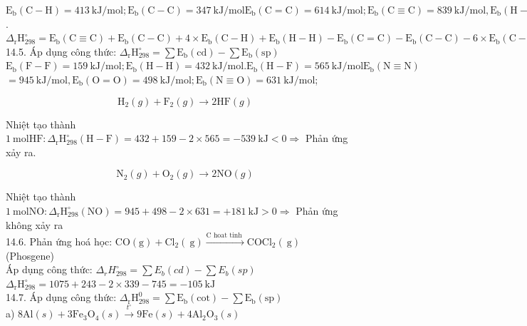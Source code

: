 \documentclass[10pt]{article}
\begin{document}
$\mathrm{E}_{\mathrm{b}}(\mathrm{C}-\mathrm{H})=413 \mathrm{~kJ} / \mathrm{mol} ; \mathrm{E}_{\mathrm{b}}(\mathrm{C}-\mathrm{C})=347 \mathrm{~kJ} / \mathrm{mol} \mathrm{E}_{\mathrm{b}}(\mathrm{C}=\mathrm{C})=614 \mathrm{~kJ} / \mathrm{mol} ; \mathrm{E}_{\mathrm{b}}(\mathrm{C} \equiv \mathrm{C}) =839 \mathrm{~kJ} / \mathrm{mol}, \mathrm{E}_{\mathrm{b}}(\mathrm{H}-\mathrm{H})=432 \mathrm{~kJ} / \mathrm{mol}$.\\
$\Delta_{\mathrm{r}} \mathrm{H}_{298}^{\circ}=\mathrm{E}_{\mathrm{b}}(\mathrm{C} \equiv \mathrm{C})+\mathrm{E}_{\mathrm{b}}(\mathrm{C}-\mathrm{C})+4 \times \mathrm{E}_{\mathrm{b}}(\mathrm{C}-\mathrm{H})+\mathrm{E}_{\mathrm{b}}(\mathrm{H}-\mathrm{H})-\mathrm{E}_{\mathrm{b}}(\mathrm{C}=\mathrm{C})-\mathrm{E}_{\mathrm{b}}(\mathrm{C}-\mathrm{C})- 6 \times \mathrm{E}_{\mathrm{b}}(\mathrm{C}-\mathrm{H})=839+347+4 \times 413+432-614-347-6 \times 413=-169 \mathrm{~kJ}$\\
14.5. Áp dụng công thức: $\Delta_{\mathrm{r}} \mathrm{H}_{298}^{\circ}=\sum \mathrm{E}_{\mathrm{b}}(\mathrm{cd})-\sum \mathrm{E}_{\mathrm{b}}(\mathrm{sp})$\\
$\mathrm{E}_{\mathrm{b}}(\mathrm{F}-\mathrm{F})=159 \mathrm{~kJ} / \mathrm{mol} ; \mathrm{E}_{\mathrm{b}}(\mathrm{H}-\mathrm{H})=432 \mathrm{~kJ} / \mathrm{mol} . \mathrm{E}_{\mathrm{b}}(\mathrm{H}-\mathrm{F})=565 \mathrm{~kJ} / \mathrm{mol} \mathrm{E}_{\mathrm{b}}(\mathrm{N} \equiv \mathrm{N})$\\
$=945 \mathrm{~kJ} / \mathrm{mol}, \mathrm{E}_{\mathrm{b}}(\mathrm{O}=\mathrm{O})=498 \mathrm{~kJ} / \mathrm{mol} ; \mathrm{E}_{\mathrm{b}}(\mathrm{N} \equiv \mathrm{O})=631 \mathrm{~kJ} / \mathrm{mol}$;

$$
\mathrm{H}_{2}(g)+\mathrm{F}_{2}(g) \rightarrow 2 \mathrm{HF}(g)
$$

Nhiệt tạo thành $1 \mathrm{~mol} \mathrm{HF}: \Delta_{\mathrm{r}} \mathrm{H}_{298}^{\circ}(\mathrm{H}-\mathrm{F})=432+159-2 \times 565=-539 \mathrm{~kJ}<0 \Rightarrow$ Phản ứng xảy ra.

$$
\mathrm{N}_{2}(g)+\mathrm{O}_{2}(g) \rightarrow 2 \mathrm{NO}(g)
$$

Nhiệt tạo thành $1 \mathrm{~mol} \mathrm{NO}: \Delta_{\mathrm{r}} \mathrm{H}_{298}^{\circ}(\mathrm{NO})=945+498-2 \times 631=+181 \mathrm{~kJ}>0 \Rightarrow$ Phản ứng không xảy ra\\
14.6. Phản ứng hoá học: $\mathrm{CO}(\mathrm{g})+\mathrm{Cl}_{2}(\mathrm{~g}) \xrightarrow{\mathrm{C} \text { hoat tinh }} \mathrm{COCl}_{2}(\mathrm{~g})$\\
(Phosgene)\\
Áp dụng công thức: $\Delta_{r} H_{298}^{\circ}=\sum E_{b}(c d)-\sum E_{b}(s p)$\\
$\Delta_{\mathrm{r}} \mathrm{H}_{298}^{\circ}=1075+243-2 \times 339-745=-105 \mathrm{~kJ}$\\
14.7. Áp dụng công thức: $\Delta_{\mathrm{r}} \mathrm{H}_{298}^{0}=\sum \mathrm{E}_{\mathrm{b}}(\mathrm{cot})-\sum \mathrm{E}_{\mathrm{b}}(\mathrm{sp})$\\
a) $8 \mathrm{Al}(s)+3 \mathrm{Fe}_{3} \mathrm{O}_{4}(s) \xrightarrow{t^{\circ}} 9 \mathrm{Fe}(s)+4 \mathrm{Al}_{2} \mathrm{O}_{3}(s)$
\end{document}
